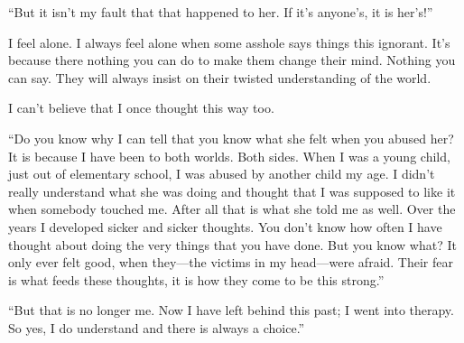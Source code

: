 \documentclass{article}
\begin{document}
	\medskip
	
	\enquote{But it isn't my fault that that happened to her. If it's anyone's, it is her's!}
	
	\medskip
	
	I feel alone. I always feel alone when some asshole says things this ignorant. It's because there nothing you can do to make them change their mind. Nothing you can say. They will always insist on their twisted understanding of the world.
	
	\medskip
	
	I can't believe that I once thought this way too.
	
	\pagebreak
	
	\enquote{Do you know why I can tell that you know what she felt when you abused her? It is because I have been to both worlds. Both sides. When I was a young child, just out of elementary school, I was abused by another child my age. I didn't really understand what she was doing and thought that I was supposed to like it when somebody touched me. After all that is what she told me as well. Over the years I developed sicker and sicker thoughts. You don't know how often I have thought about doing the very things that you have done. But you know what? It only ever felt good, when they—the victims in my head—were afraid. Their fear is what feeds these thoughts, it is how they come to be this strong.}
	
	\medskip
	
	\enquote{But that is no longer me. Now I have left behind this past; I went into therapy. So yes, I do understand and there is always a choice.}
\end{document}
